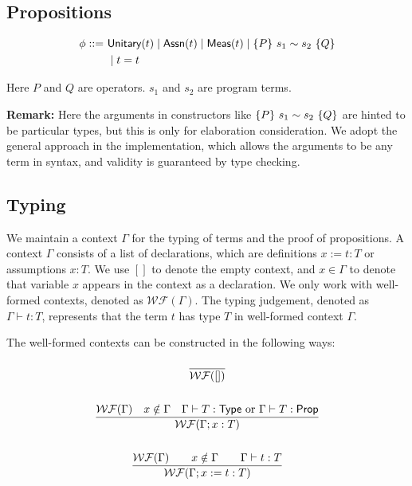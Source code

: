 \subsection{Propositions}

\begin{definition}
    \label{def:prop syntax}
    \begin{align*}
        \phi ::=\ & \textsf{Unitary}({t}) \mid \textsf{Assn}(t) \mid \textsf{Meas}(t) \mid \{P\}~s_1 \sim s_2~\{Q\} \\
                & \mid t = t
    \end{align*}
\end{definition}
Here $P$ and $Q$ are operators. $s_1$ and $s_2$ are program terms.

\textbf{Remark:} Here the arguments in constructors like $\{P\}~s_1 \sim s_2~\{Q\}$ are hinted to be particular types, but this is only for elaboration consideration. We adopt the general approach in the implementation, which allows the arguments to be any term in syntax, and validity is guaranteed by type checking.


\subsection{Typing}

\newcommand{\WF}[1]{\ensuremath{\mathcal{WF}(#1)}}

We maintain a context $\Gamma$ for the typing of terms and the proof of propositions. 
A context $\Gamma$ consists of a list of declarations, which are definitions $x := t : T$ or assumptions $x : T$. 
We use $[]$ to denote the empty context, and $x \in \Gamma$ to denote that variable $x$ appears in the context as a declaration.
We only work with well-formed contexts, denoted as \WF{\Gamma}. 
The typing judgement, denoted as $\Gamma \vdash t : T$, represents that the term $t$ has type $T$ in well-formed context $\Gamma$. 


The well-formed contexts can be constructed in the following ways:

\begin{gather*}
    \frac{}{\WF{[]}} \\
    \\
    \frac{\WF{\Gamma} \quad x \notin \Gamma \quad \Gamma \vdash T : \Type \text{ or } \Gamma \vdash T : \prop}{\WF{\Gamma;x:T}} \\
    \\
    \frac{\WF{\Gamma} \qquad x \notin \Gamma \qquad \Gamma \vdash t : T}{\WF{\Gamma;x := t : T}} \\
\end{gather*}

